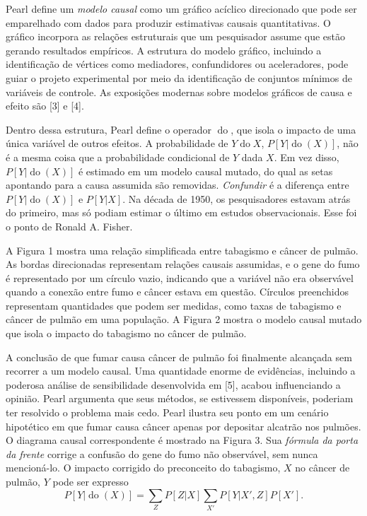     Pearl define um \textit{modelo causal} como um gráfico acíclico direcionado que pode ser emparelhado com dados para produzir estimativas causais quantitativas. O gráfico incorpora as relações estruturais que um pesquisador assume que estão gerando resultados empíricos. A estrutura do modelo gráfico, incluindo a identificação de vértices como mediadores, confundidores ou aceleradores, pode guiar o projeto experimental por meio da identificação de conjuntos mínimos de variáveis de controle. As exposições modernas sobre modelos gráficos de causa e efeito são [3] e [4].

\noindent
\begin{minipage}[!ht]{\columnwidth}\centering
{}
\label{fig:02}
\end{minipage}


    Dentro dessa estrutura, Pearl define o operador \(\operatorname{do}\), que isola o impacto de uma única variável de outros efeitos. A probabilidade de \(Y \operatorname{do} X\), \(P[Y|\operatorname{do}(X)]\), não é a mesma coisa que a probabilidade condicional de \(Y\) dada \(X\). Em vez disso, \(P[Y|\operatorname{do}(X)] \) é estimado em um modelo causal mutado, do qual as setas apontando para a causa assumida são removidas. \textit{Confundir} é a diferença entre \(P[Y|\operatorname{do}(X)]\) e \(P[Y|X]\). Na década de 1950, os pesquisadores estavam atrás do primeiro, mas só podiam estimar o último em estudos observacionais. Esse foi o ponto de Ronald A. Fisher.

    A Figura 1 mostra uma relação simplificada entre tabagismo e câncer de pulmão. As bordas direcionadas representam relações causais assumidas, e o gene do fumo é representado por um círculo vazio, indicando que a variável não era observável quando a conexão entre fumo e câncer estava em questão. Círculos preenchidos representam quantidades que podem ser medidas, como taxas de tabagismo e câncer de pulmão em uma população. A Figura 2 mostra o modelo causal mutado que isola o impacto do tabagismo no câncer de pulmão.

    A conclusão de que fumar causa câncer de pulmão foi finalmente alcançada sem recorrer a um modelo causal. Uma quantidade enorme de evidências, incluindo a poderosa análise de sensibilidade desenvolvida em [5], acabou influenciando a opinião. Pearl argumenta que seus métodos, se estivessem disponíveis, poderiam ter resolvido o problema mais cedo. Pearl ilustra seu ponto em um cenário hipotético em que fumar causa câncer apenas por depositar alcatrão nos pulmões. O diagrama causal correspondente é mostrado na Figura 3. Sua \textit{fórmula da porta da frente} corrige a confusão do gene do fumo não observável, sem nunca mencioná-lo. O impacto corrigido do preconceito do tabagismo, \(X\) no câncer de pulmão, \(Y\) pode ser expresso
    \[P[Y|\operatorname{do}(X)] = \sum_ {Z} P[Z|X] \sum_ {X'} P[Y|X',Z] P[X'].\]


